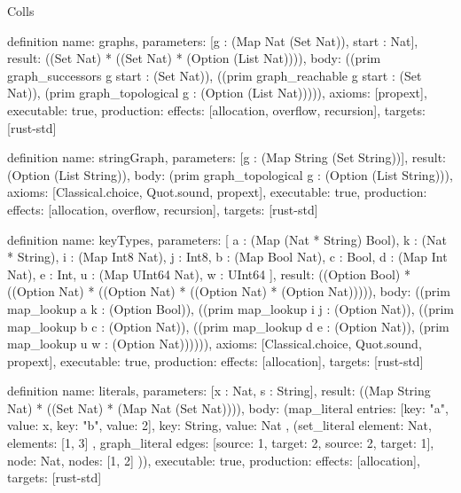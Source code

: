 \begin{lexlean}{Colls}
\begin{semanticmodule}
definition{
  name: graphs,
  parameters: [g : (Map Nat (Set Nat)), start : Nat],
  result: ((Set Nat) * ((Set Nat) * (Option (List Nat)))),
  body: ((prim graph_successors g start : (Set Nat)), ((prim graph_reachable g start : (Set Nat)), (prim graph_topological g : (Option (List Nat))))),
  axioms: [propext],
  executable: true,
  production: {effects: [allocation, overflow, recursion], targets: [rust-std]}
}

definition{
  name: stringGraph,
  parameters: [g : (Map String (Set String))],
  result: (Option (List String)),
  body: (prim graph_topological g : (Option (List String))),
  axioms: [Classical.choice, Quot.sound, propext],
  executable: true,
  production: {effects: [allocation, overflow, recursion], targets: [rust-std]}
}

definition{
  name: keyTypes,
  parameters: [
    a : (Map (Nat * String) Bool),
    k : (Nat * String),
    i : (Map Int8 Nat),
    j : Int8,
    b : (Map Bool Nat),
    c : Bool,
    d : (Map Int Nat),
    e : Int,
    u : (Map UInt64 Nat),
    w : UInt64
  ],
  result: ((Option Bool) * ((Option Nat) * ((Option Nat) * ((Option Nat) * (Option Nat))))),
  body: ((prim map_lookup a k : (Option Bool)), ((prim map_lookup i j : (Option Nat)), ((prim map_lookup b c : (Option Nat)), ((prim map_lookup d e : (Option Nat)), (prim map_lookup u w : (Option Nat)))))),
  axioms: [Classical.choice, Quot.sound, propext],
  executable: true,
  production: {effects: [allocation], targets: [rust-std]}
}

definition{
  name: literals,
  parameters: [x : Nat, s : String],
  result: ((Map String Nat) * ((Set Nat) * (Map Nat (Set Nat)))),
  body: (map_literal{
    entries: [{key: "a", value: x}, {key: "b", value: 2}],
    key: String,
    value: Nat
  }, (set_literal{
    element: Nat,
    elements: [1, 3]
  }, graph_literal{
    edges: [{source: 1, target: 2}, {source: 2, target: 1}],
    node: Nat,
    nodes: [1, 2]
  })),
  executable: true,
  production: {effects: [allocation], targets: [rust-std]}
}
\end{semanticmodule}
\end{lexlean}
